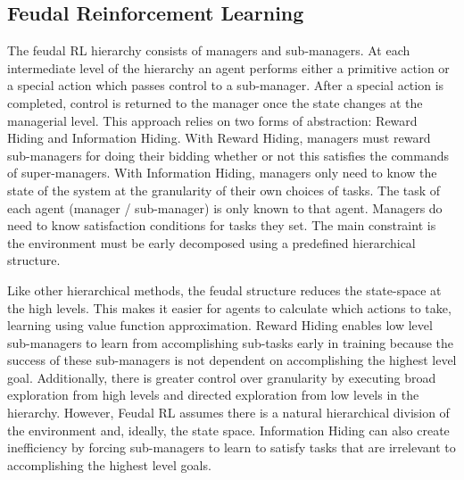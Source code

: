 \subsection{Feudal Reinforcement Learning}

The feudal RL \cite{Dayan} hierarchy consists
of managers and sub-managers. At each intermediate level of the hierarchy an agent performs
either a primitive action or a special action which passes control to a sub-manager.
After a special action is completed, control is
returned to the manager once the state changes at the managerial level. This
approach relies on two
forms of abstraction: Reward Hiding and Information Hiding. 
With Reward Hiding, managers must reward sub-managers for doing their bidding whether or not this
satisfies the commands of super-managers. With Information Hiding, managers only need to know the state of the system at the granularity of their own choices of tasks. The task of each agent (manager / sub-manager) is only known to that agent. Managers do need to know satisfaction conditions for tasks they set. The main constraint is the environment must be early
decomposed using a predefined hierarchical structure.

Like other hierarchical methods, the feudal structure reduces the state-space at the high levels.
This makes it easier for agents to calculate which actions to take, learning using value function approximation.
Reward Hiding enables low level sub-managers to learn from accomplishing sub-tasks early in training
because the success of these sub-managers is not dependent on accomplishing the highest level goal.
Additionally, there is  greater control over granularity by executing broad exploration from high levels
and directed exploration from low levels in the hierarchy. However, Feudal RL assumes there is a natural hierarchical division of the environment and, ideally, the state space. Information Hiding can also create inefficiency by forcing sub-managers to learn to satisfy tasks that are irrelevant to accomplishing the highest level goals.


